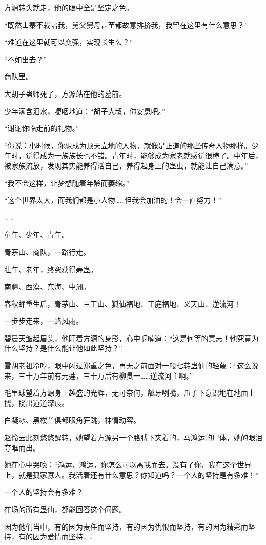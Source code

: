 \begin{this_body}
方源转头就走，他的眼中全是坚定之色。

“既然山寨不栽培我，舅父舅母甚至都故意排挤我，我留在这里有什么意思？”

“难道在这里就可以变强，实现长生么？”

“不如出去？”

商队里。

大胡子蛊师死了，方源站在他的墓前。

少年满含泪水，哽咽地道：“胡子大叔，你安息吧。”

“谢谢你临走前的礼物。”

“你说：小时候，你想成为顶天立地的人物，就像是正道的那些传奇人物那样。少年时，觉得成为一族族长也不错。青年时，能够成为家老就感觉很棒了。中年后，被家族流放，发现其实能养得活自己，养得起身上的蛊虫，就能让自己满意。”

“我不会这样，让梦想随着年龄而萎缩。”

“这个世界太大，而我们都是小人物……但我会加油的！会一直努力！”

……

童年、少年、青年。

青茅山、商队，一路行走。

壮年、老年，终究获得寿蛊。

南疆、西漠、东海、中洲。

春秋蝉重生后，青茅山、三王山、狐仙福地、王庭福地、义天山、逆流河！

一步步走来，一路风雨。

碧晨天皱起眉头，他盯着方源的身影，心中呢喃道：“这是何等的意志！他究竟为什么坚持？是什么能让他如此坚持？”

雪胡老祖冷哼，眼中闪过郑重之色，再无之前面对一般七转蛊仙的轻蔑：“这么说来，三十万年前有元莲，三十万后有柳贯一……逆流河主啊。”

毛里球望着方源身上越盛的光辉，无可奈何，龇牙咧嘴，爪子下意识地在地面上挠，挠出道道深痕。

白凝冰、黑楼兰俱都眼角狂跳，神情动容。

赵怜云此刻悠悠醒转，她望着方源另一个胳膊下夹着的，马鸿运的尸体，她的眼泪夺眶而出。

她在心中哭嚎：“鸿运，鸿运，你怎么可以离我而去。没有了你，我在这个世界上，就是孤家寡人。我活着还有什么意思？你知道吗？一个人的坚持是有多难！”

一个人的坚持会有多难？

在场的所有蛊仙，都能回答这个问题。

因为他们当中，有的因为责任而坚持，有的因为仇恨而坚持，有的因为精彩而坚持，有的因为爱情而坚持……


\end{this_body}
